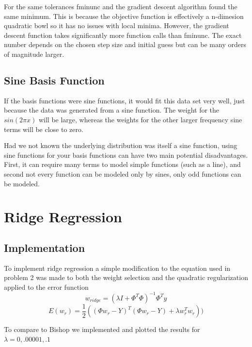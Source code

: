 \documentclass[10pt,twocolumn]{article}
\begin{document}
For the same tolerances fminunc and the gradient descent algorithm found the same minimum. This is because the objective function is effectively a n-dimesion quadratic bowl so it has no issues with local minima. However, the gradient descent function takes significantly more function calls than fminunc. The exact number depends on the chosen step size and initial guess but can be many orders of magnitude larger. 

\subsection*{ Sine Basis Function}
If the basis functions were sine functions, it would fit this data set very well, just because the data was generated from a sine function. The weight for the $sin(2 \pi x)$ will be large, whereas the weights for the other larger frequency sine terms will be close to zero.

Had we not known the underlying distribution was itself a sine function, using sine functions for your basis functions can have two main potential disadvantages. First, it can require many terms to model simple functions (such as a line), and second not every function can be modeled only by sines, only odd functions can be modeled.

\section{Ridge Regression}

\subsection*{ Implementation}

To implement ridge regression a simple modification to the equation used in problem 2 was made to both the weight selection and the quadratic regularization applied to the error function 
\begin{equation}
w_{ridge} = (\lambda I + \Phi^T  \Phi)^{-1}  \Phi^T y
\end{equation}
\begin{equation}
E(w_{r}) = \frac{1}{2}((\Phi w_{r}  -Y)^T( \Phi w_{r}  -Y) + \lambda w_{r}^T w_{r}))
\end{equation}

To compare to Bishop we implemented and plotted the results for $\lambda = {0, .00001, .1} $
\end{document}
